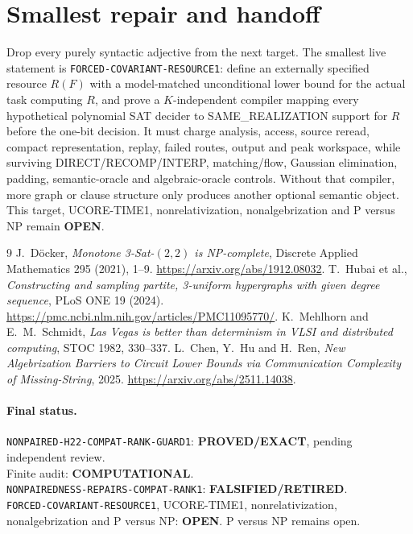 \documentclass[11pt]{article}
\newcommand{\EXACT}{\textbf{PROVED/EXACT}}
\newcommand{\OPEN}{\textbf{OPEN}}
\newcommand{\RETIRED}{\textbf{FALSIFIED/RETIRED}}
\newcommand{\COMP}{\textbf{COMPUTATIONAL}}
\begin{document}
\section{Smallest repair and handoff}

Drop every purely syntactic adjective from the next target.  The smallest
live statement is \texttt{FORCED-COVARIANT-RESOURCE1}: define an externally
specified resource $R(F)$ with a model-matched unconditional lower bound for
the actual task computing $R$, and prove a $K$-independent compiler mapping
every hypothetical polynomial SAT decider to SAME\_REALIZATION support for
$R$ before the one-bit decision.  It must charge analysis, access, source
reread, compact representation, replay, failed routes, output and peak
workspace, while surviving DIRECT/RECOMP/INTERP, matching/flow, Gaussian
elimination, padding, semantic-oracle and algebraic-oracle controls.  Without
that compiler, more graph or clause structure only produces another optional
semantic object.  This target, UCORE-TIME1, nonrelativization,
nonalgebrization and P versus NP remain \OPEN.

\begin{thebibliography}{9}
 J.~D\"ocker,
\emph{Monotone 3-Sat-$(2,2)$ is NP-complete},
Discrete Applied Mathematics 295 (2021), 1--9.
\url{https://arxiv.org/abs/1912.08032}.
 T.~Hubai et al.,
\emph{Constructing and sampling partite, 3-uniform hypergraphs with given
degree sequence}, PLoS ONE 19 (2024).
\url{https://pmc.ncbi.nlm.nih.gov/articles/PMC11095770/}.
 K.~Mehlhorn and E.~M.~Schmidt,
\emph{Las Vegas is better than determinism in VLSI and distributed
computing}, STOC 1982, 330--337.
 L.~Chen, Y.~Hu and H.~Ren,
\emph{New Algebrization Barriers to Circuit Lower Bounds via Communication
Complexity of Missing-String}, 2025. \url{https://arxiv.org/abs/2511.14038}.
\end{thebibliography}

\paragraph{Final status.}
\texttt{NONPAIRED-H22-COMPAT-RANK-GUARD1}: \EXACT, pending independent review.\\
Finite audit: \COMP.\\
\texttt{NONPAIREDNESS-REPAIRS-COMPAT-RANK1}: \RETIRED.\\
\texttt{FORCED-COVARIANT-RESOURCE1}, UCORE-TIME1,
nonrelativization, nonalgebrization and P versus NP: \OPEN.
P versus NP remains open.

\end{document}
